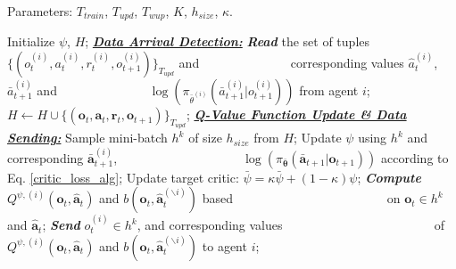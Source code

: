 \begin{algorithm}[t]
    \small
    \caption{\small\textit{Learning Procedures for Central Entity}}
    \label{learning_alg_central}
    Parameters: $T_{train}$, $T_{upd}$, $T_{wup}$, $K$, $h_{size}$, $\kappa$.
    \begin{algorithmic}[1]
        \State Initialize $\psi$, $H$;
            \vspace{6pt}
            \State \underline{\textbf{\textit{Data Arrival Detection:}}}
             
                \State \textbf{\textit{Read}} the set of tuples $\{(o^{(i)}_t,a^{(i)}_t,r^{(i)}_t,o^{(i)}_{t+1})\}_{T_{upd}}$ and \Statex ~~~~~~~~~~~~~~corresponding values $\hat{a}^{(i)}_t$, $\bar{a}^{(i)}_{t+1}$ and 
                \Statex ~~~~~~~~~~~~~~$\log(\pi_{\bar{\theta}^{(i)}}(\bar{a}_{t+1}^{(i)}|o_{t+1}^{(i)}))$ from agent $i$;
            \EndFor
            \State $H \gets H \cup \{(\mathbf{o}_t, \mathbf{a}_t, \mathbf{r}_t, \mathbf{o}_{t+1})\}_{T_{upd}}$;
            \vspace{6pt}
            \State \underline{\textbf{\textit{Q-Value Function Update \& Data Sending:}}}
                    \State Sample mini-batch $h^{k}$ of size $h_{size}$ from $H$;
                    \State Update $\psi$ using $h^{k}$ and corresponding $\mathbf{\bar{a}}^{(i)}_{t+1}$,\Statex ~~~~~~~~~~~~~~~~~~~~$\log(\pi_{\bar{\boldsymbol{\uptheta}}}(\mathbf{\bar{a}}_{t+1}|\mathbf{o}_{t+1}))$ according to Eq. \eqref{critic_loss_alg};
                    \State Update target critic: $\bar{\psi} = \kappa\bar{\psi} + (1-\kappa)\psi$;
                \EndFor
                        \State \textbf{\textit{Compute}} $Q^{\psi,(i)}(\mathbf{o}_t,\mathbf{\hat{a}}_t)$ and $b(\mathbf{o}_t,\mathbf{\hat{a}}^{(\backslash i)}_t)$ based
                        \Statex ~~~~~~~~~~~~~~~~~~~~~~~~on $\mathbf{o}_t\in h^k$ and $\mathbf{\hat{a}}_t$; 
                        \State \textbf{\textit{Send}} $o^{(i)}_t \in h^{k}$,
                        and corresponding values
                        \Statex ~~~~~~~~~~~~~~~~~~~~~~~ of $Q^{\psi,(i)}(\mathbf{o}_t,\mathbf{\hat{a}}_t)$ and $b(\mathbf{o}_t,\mathbf{\hat{a}}^{(\backslash i)}_t)$ to agent $i$;
                    \EndFor
                \EndFor
            \EndIf

        \EndFor
    \end{algorithmic}
\end{algorithm}

